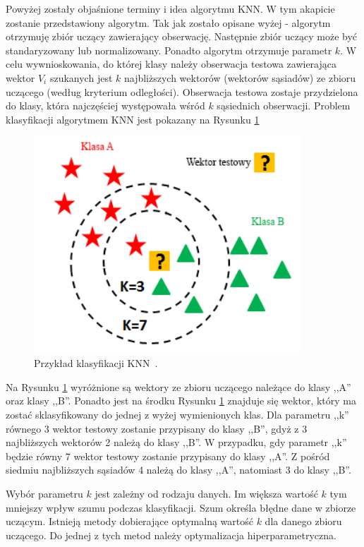 \documentclass[a4paper,twoside,12pt]{book}
\begin{document}
    Powyżej zostały objaśnione terminy i idea algorytmu KNN. W tym akapicie zostanie przedstawiony algorytm.
    Tak jak zostało opisane wyżej - algorytm otrzymuję zbiór uczący zawierający obserwację. Następnie zbiór uczący
    może być standaryzowany lub normalizowany. Ponadto algorytm otrzymuje parametr $k$.
    W celu wywnioskowania, do której klasy należy obserwacja testowa zawierająca wektor $V_{i}$ szukanych jest $k$
    najbliższych wektorów (wektorów sąsiadów) ze zbioru uczącego (według kryterium odległości). Obserwacja testowa
    zostaje przydzielona do klasy, która najczęściej występowała wśród $k$ sąsiednich obserwacji.
    Problem klasyfikacji algorytmem KNN jest pokazany na Rysunku \ref{fig.klasyfikacjaKNN}
    \begin{figure}
        \centering
        \includegraphics[width=10cm]{Obrazy/klasyfikacjaKNN.jpg}
        \caption{Przykład klasyfikacji KNN~\cite{KNNObraz}.}
        \label{fig.klasyfikacjaKNN}
    \end{figure}

    Na Rysunku \ref{fig.klasyfikacjaKNN} wyróżnione są wektory ze zbioru uczącego należące do klasy ,,A'' oraz klasy
    ,,B''. Ponadto jest na środku Rysunku \ref{fig.klasyfikacjaKNN} znajduje się wektor, który ma zostać
    sklasyfikowany do jednej z wyżej wymienionych klas.
    Dla parametru ,,k'' równego 3 wektor testowy zostanie przypisany do klasy ,,B'', gdyż z 3 najbliższych wektorów 2
    należą do klasy ,,B''. W przypadku, gdy parametr ,,k'' będzie równy 7 wektor testowy zostanie przypisany do klasy
    ,,A''. Z pośród siedmiu najbliższych sąsiadów 4 należą do klasy ,,A'', natomiast 3 do klasy ,,B''.

    Wybór parametru $k$ jest zależny od rodzaju danych. Im większa wartość $k$ tym mniejszy wpływ szumu podczas
    klasyfikacji. Szum określa błędne dane w zbiorze uczącym. Istnieją metody dobierające optymalną wartość $k$ dla
    danego zbioru uczącego. Do jednej z tych metod należy optymalizacja hiperparametryczna.
\end{document}
